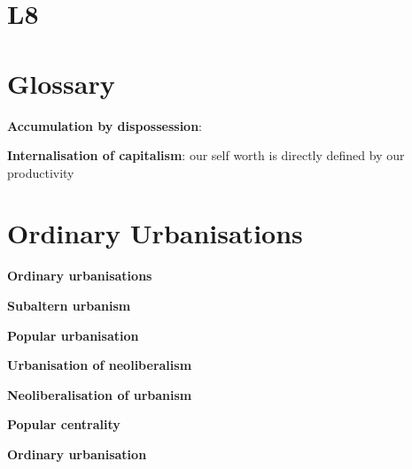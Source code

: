 \documentclass{article}
\begin{document}
\textbf{}

\textbf{}

\textbf{}

\textbf{}


\textbf{}

\textbf{}

\textbf{}

\textbf{}

\textbf{}

\textbf{}

\textbf{}

\pagebreak
\section{L8}


\textbf{}

\textbf{}

\textbf{}

\textbf{}

\textbf{}

\textbf{}

\textbf{}

\textbf{}

\textbf{}

\textbf{}

\textbf{}

\section{Glossary}

\textbf{Accumulation by dispossession}:

\textbf{Internalisation of capitalism}: our self worth is directly defined by our productivity

\section{Ordinary Urbanisations}

\textbf{Ordinary urbanisations}

\textbf{Subaltern urbanism}

\textbf{Popular urbanisation}

\textbf{Urbanisation of neoliberalism}

\textbf{Neoliberalisation of urbanism}

\textbf{Popular centrality}

\textbf{Ordinary urbanisation}


\textbf{}


\textbf{}
\end{document}
